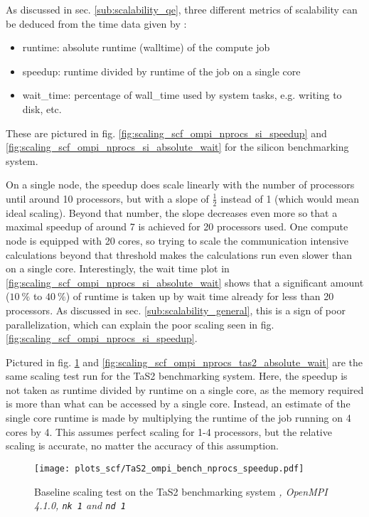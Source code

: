 \documentclass[main.tex]{subfiles}
\begin{document}
As discussed in sec. \ref{sub:scalability_qe}, three different metrics of scalability can be deduced from the time data given by \QE:
\begin{itemize}
    \item runtime: absolute runtime (walltime) of the compute job
    \item speedup: runtime divided by runtime of the job on a single core
    \item \gls{wait_time}: percentage of \gls{wall_time} used by system tasks, e.g. writing to disk, etc.
\end{itemize}
These are pictured in fig. \ref{fig:scaling_scf_ompi_nprocs_si_speedup} and \ref{fig:scaling_scf_ompi_nprocs_si_absolute_wait} for the silicon benchmarking system.

On a single node, the speedup does scale linearly with the number of processors until around 10 processors, but with a slope of \(\frac{1}{2}\) instead of 1 (which would mean ideal scaling).
Beyond that number, the slope decreases even more so that a maximal speedup of around 7 is achieved for 20 processors used.
One compute node is equipped with 20 cores, so trying to scale the communication intensive calculations beyond that threshold makes the calculations run even slower than on a single core.
Interestingly, the wait time plot in \ref{fig:scaling_scf_ompi_nprocs_si_absolute_wait} shows that a significant amount (\(\SI{10}{\percent}\) to \(\SI{40}{\percent}\)) of runtime is taken up by wait time already for less than 20 processors.
As discussed in sec. \ref{sub:scalability_general}, this is a sign of poor parallelization, which can explain the poor scaling seen in fig. \ref{fig:scaling_scf_ompi_nprocs_si_speedup}.

Pictured in fig. \ref{fig:scaling_scf_ompi_nprocs_tas2_speedup} and \ref{fig:scaling_scf_ompi_nprocs_tas2_absolute_wait} are the same scaling test run for the TaS2 benchmarking system.
Here, the speedup is not taken as runtime divided by runtime on a single core, as the memory required is more than what can be accessed by a single core.
Instead, an estimate of the single core runtime is made by multiplying the runtime of the job running on 4 cores by 4.
This assumes perfect scaling for 1-4 processors, but the relative scaling is accurate, no matter the accuracy of this assumption.

\begin{figure}[ht!]
\centering
\texttt{[image: plots\_scf/TaS2\_ompi\_bench\_nprocs\_speedup.pdf]}
\caption{Baseline scaling test on the TaS2 benchmarking system \emph{, OpenMPI 4.1.0, \texttt{nk 1} and \texttt{nd 1}}}
\label{fig:scaling_scf_ompi_nprocs_tas2_speedup}
\end{figure}
\end{document}

